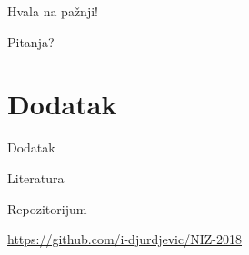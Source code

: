 \documentclass[serbian]{beamer}
\begin{document}
\begin{frame}

\vspace*{3em}

{\Large Hvala na pa\v znji!} 

\vspace*{1em}

Pitanja?

\end{frame}

\section{Dodatak}

\begin{frame}{Dodatak}

\begin{flushleft}
	{\Large Literatura}
\end{flushleft}

\nocite{NumOpt}

\printbibliography

\begin{flushleft}
	{\Large Repozitorijum}
\end{flushleft}

\href{https://github.com/i-djurdjevic/NIZ-2018}{https://github.com/i-djurdjevic/NIZ-2018}

\end{frame}
\end{document}
